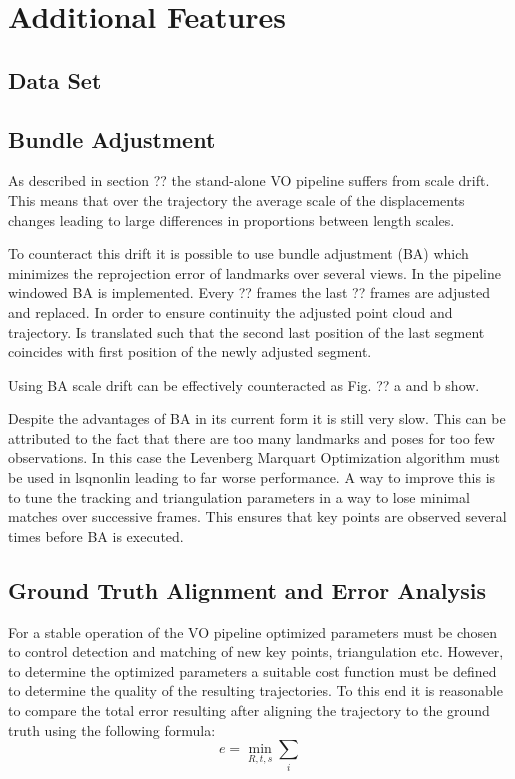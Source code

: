 \chapter{Additional Features}
\section{Data Set}
\label{dataset}

\section{Bundle Adjustment}
\label{bundle adjustment}
As described in section ?? the stand-alone VO pipeline suffers from scale drift. This means that over the trajectory the average scale of the displacements changes leading to large differences in proportions between length scales. \par
To counteract this drift it is possible to use bundle adjustment (BA) which minimizes the reprojection error of landmarks over several views. In the pipeline windowed BA is implemented. Every ?? frames the last ?? frames are adjusted and replaced. In order to ensure continuity the adjusted point cloud and trajectory. Is translated such that the second last position of the last segment coincides with first position of the newly adjusted segment. \par
Using BA scale drift can be effectively counteracted as Fig. ?? a and b show. \par
Despite the advantages of BA in its current form it is still very slow. This can be attributed to the fact that there are too many landmarks and poses for too few observations. In this case the Levenberg Marquart Optimization algorithm must be used in lsqnonlin leading to far worse performance. A way to improve this is to tune the tracking and triangulation parameters in a way to lose minimal matches over successive frames. This ensures that key points are observed several times before BA is executed. 

\section{Ground Truth Alignment and Error Analysis}
\label{simulation}
For a stable operation of the VO pipeline optimized parameters must be chosen to control detection and matching of new key points, triangulation etc. However, to determine the optimized parameters a suitable cost function must be defined to determine the quality of the resulting trajectories. To this end it is reasonable to compare the total error resulting after aligning the trajectory to the ground truth using the following formula:
$$e = \underset{R,t,s}{\min} \sum_i$$
